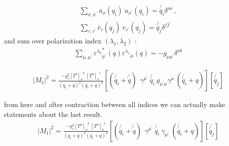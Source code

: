 \begin{equation}
\begin{split}
\displaystyle\sum\limits_{{\sigma},{\sigma}^{\prime}} {\bar{u}}_{\sigma}(q_i)\:u_{{\sigma}^{\prime}}(q_i) = \not{q_i} \delta^{{o}{o}^{\prime}},\\
\displaystyle\sum\limits_{{\tau},{\tau}^{\prime}} {\bar{v}}_{\tau}(q_j)\:v_{{\tau}^{\prime}}(q_j) = \not{q_j} \delta^{{f}{f}^{\prime}}
\end{split}
\end{equation}
and sum over polarization index $({\lambda_{1}},{\lambda}_{2})$ :
\begin{equation}
\begin{split}
 \displaystyle\sum\limits_{{\mu},{\mu}^{\prime}} {{\varepsilon^{\lambda_2}}_{{\mu}^{\prime}}^* (q) {\varepsilon^{\lambda_1}}_{\mu} (q)} = -g_{{\mu}{\mu}^{\prime}} \delta^{{a}{b}}
\end{split}
\end{equation}

\begin{equation}
\begin{split}
|M_1|^2=\frac{-g_s^2  {[T^a]_{o}}^k \: {[T^a]_o}^l }{(q_i + q)^2 (q_i + q)^2}
[(\not{q_i} + \not{q}) \:
 \:  \gamma^{{\mu}^{\prime}} \: \not{q_i} \: g_{{{\mu}^{\prime}}{\mu}} 
\gamma^{\mu} \: (\not{q_i} + q)]
[\not{q_j}]
\end{split}
\end{equation}

from here and after contraction between all indices we can actually make statements about the last result.
\begin{equation}
\begin{split}
|M_1|^2=\frac{-g_s^2  {[T^a]_{o}}^k \: {[T^a]_o}^l }{(q_i + q)^2 (q_i + q)^2}
[(\not{q_i} + \not{q}) \:
 \:  \gamma^{{\mu}^{\prime}} \: \not{q_i} \: 
\gamma_{{\mu}^{\prime}} \: (\not{q_i} + q)]
[\not{q_j}]
\end{split}
\end{equation}

